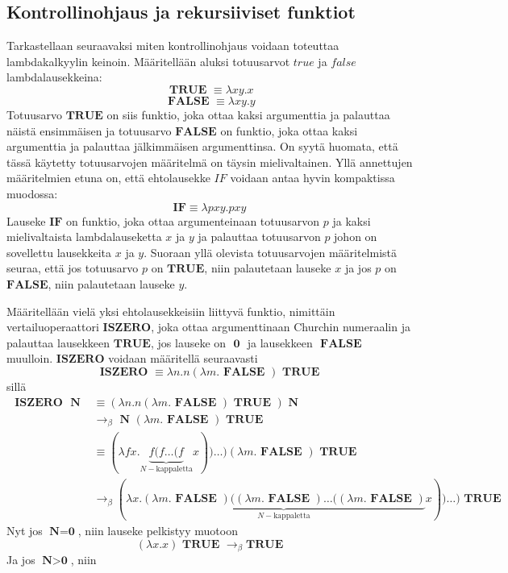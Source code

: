 \subsection{Kontrollinohjaus ja rekursiiviset funktiot}
Tarkastellaan seuraavaksi miten kontrollinohjaus voidaan toteuttaa lambdakalkyylin keinoin. Määritellään aluksi totuusarvot $true$ ja $false$ lambdalausekkeina:
\[ \textbf{ TRUE } \equiv \lambda x y . x \]
\[ \textbf{ FALSE } \equiv \lambda x y . y \]
Totuusarvo $\textbf{TRUE}$ on siis funktio, joka ottaa kaksi argumenttia ja palauttaa näistä ensimmäisen ja totuusarvo $\textbf{FALSE}$ on funktio, joka ottaa kaksi argumenttia ja palauttaa jälkimmäisen argumenttinsa. On syytä huomata, että tässä käytetty totuusarvojen määritelmä on täysin mielivaltainen. Yllä annettujen määritelmien etuna on, että ehtolausekke $IF$ voidaan antaa hyvin kompaktissa muodossa:
\[ \textbf{IF} \equiv \lambda p x y . p x y \]  
Lauseke $\textbf{IF}$ on funktio, joka ottaa argumenteinaan totuusarvon $p$ ja kaksi mielivaltaista lambdalauseketta $x$ ja $y$ ja palauttaa totuusarvon $p$ johon on sovellettu lausekkeita $x$ ja $y$. Suoraan yllä olevista totuusarvojen määritelmistä seuraa, että jos totuusarvo $p$ on $\textbf{TRUE}$, niin palautetaan lauseke $x$ ja jos $p$ on $\textbf{FALSE}$, niin palautetaan lauseke $y$.
\par 
Määritellään vielä yksi ehtolausekkeisiin liittyvä funktio, nimittäin vertailuoperaattori $\textbf{ISZERO}$, joka ottaa argumenttinaan Churchin numeraalin ja palauttaa lausekkeen $\textbf{TRUE}$, jos lauseke on $\textbf{ 0 }$ ja lausekkeen $\textbf{ FALSE }$ muulloin. $\textbf{ISZERO}$ voidaan määritellä seuraavasti
\[\textbf{ ISZERO } \equiv \lambda n . n (\lambda m . \textbf{ FALSE }) \textbf{ TRUE }  \]
sillä
\begin{align*}
\textbf{ ISZERO } \textbf{ N }
&\equiv (\lambda n . n (\lambda m . \textbf{ FALSE }) \textbf{ TRUE }) \textbf{ N } \\
&\rightarrow_{\beta} \textbf{ N } (\lambda m . \textbf{ FALSE }) \textbf{ TRUE } \\
&\equiv (\lambda fx . \underbrace{ f ( f \ldots (f }_{ N-\text{kappaletta}} x)) \ldots )  (\lambda m . \textbf{ FALSE }) \textbf{ TRUE } \\
&\rightarrow_{\beta} (\lambda x . \underbrace{ (\lambda m . \textbf{ FALSE }) ( (\lambda m . \textbf{ FALSE }) \ldots ((\lambda m . \textbf{ FALSE }) }_{ N-\text{kappaletta}} x)) \ldots ) \textbf{ TRUE }
\end{align*} 
Nyt jos $\textbf{N} = \textbf{0}$, niin lauseke pelkistyy muotoon
\[ (\lambda x . x) \textbf{ TRUE } \rightarrow_{\beta} \textbf{TRUE} \]
Ja jos $\textbf{N} > \textbf{0}$, niin

